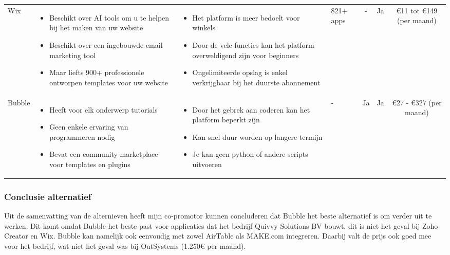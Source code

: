 \begin{longtable}{p{2.2cm} p{4.4cm} p{3.4cm} p{2.2cm} c c c}
    Wix & 
    \begin{itemize}

        \item Beschikt over AI tools om u te helpen bij het maken van uw website
        \item Beschikt over een ingebouwde email marketing tool
        \item Maar liefts 900+ professionele ontworpen templates voor uw website
    \end{itemize} & 
    \begin{itemize}
        \item Het platform is meer bedoelt voor winkels
        \item Door de vele functies kan het platform overweldigend zijn voor beginners
        \item Ongelimiteerde opslag is enkel verkrijgbaar bij het duurste abonnement
    \end{itemize} &
    821+ apps &
    - &
    Ja &
    €11 tot €149 (per maand)\\

    Bubble & 
    \begin{itemize}
        \item Heeft voor elk onderwerp tutorials
        \item Geen enkele ervaring van programmeren nodig
        \item Bevat een community marketplace voor templates en plugins
    \end{itemize} & 
    \begin{itemize}
        \item Door het gebrek aan coderen kan het platform beperkt zijn
        \item Kan snel duur worden op langere termijn
        \item Je kan geen python of andere scripts uitvoeren
    \end{itemize} &
    - &
    Ja &
    Ja &
    €27 - €327 (per maand)\\
\end{longtable}

\subsubsection*{Conclusie alternatief}
Uit de samenvatting van de alternieven heeft mijn co-promotor kunnen concluderen dat Bubble het beste alternatief is om verder uit te werken.
Dit komt omdat Bubble het beste past voor applicaties dat het bedrijf Quivvy Solutions BV bouwt, dit is niet het geval bij Zoho Creator en Wix. 
Bubble kan namelijk ook eenvoudig met zowel AirTable als MAKE.com integreren. Daarbij valt de prijs ook goed mee voor het bedrijf, wat niet het geval was bij OutSystems (1.250€ per maand).


